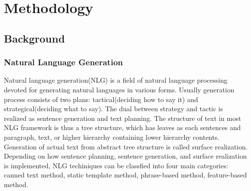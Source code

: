 \documentclass{sig-alternate}
\begin{document}

\section{Methodology} 

\subsection{Background} 

\subsubsection{Natural Language Generation} 

Natural language generation(NLG) is a field of natural language processing devoted for generating natural languages in various forms. Usually generation process consists of two plans: tactical(deciding how to say it) and strategical(deciding what to say). The dual between strategy and tactic is realized as sentence generation and text planning. The structure of text in most NLG framework is thus a tree structure, which has leaves as each sentences and paragraph, text, or higher hierarchy containing lower hierarchy contents. Generation of actual text from abstract tree structure is called surface realization. Depending on how sentence planning, sentence generation, and surface realization is implemented, NLG techiniques can be classfied into four main categories\cite{ency}: canned text method, static template method, phrase-based method, feature-based method. 
\end{document}
